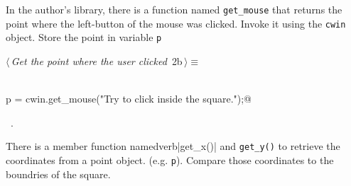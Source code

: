\documentclass{article}
\begin{document}
In the author's library, there is a function named \verb|get_mouse| that
returns the point where the left-button of the mouse was clicked. Invoke it
using the \verb|cwin| object. Store the point in variable \verb|p|
\begin{flushleft} \small
\begin{minipage}{\linewidth}\label{scrap3}\raggedright\small
{} $\langle\,${\it Get the point where the user clicked}\nobreak\ {\footnotesize {2b}}$\,\rangle\equiv$
\vspace{-1ex}
\begin{list}{}{} \item
\mbox{}\verb@@\\
\mbox{}\verb@Point p = cwin.get_mouse("Try to click inside the square.");@\\
\mbox{}\verb@@{\NWsep}
\end{list}
\vspace{-1.5ex}
\footnotesize
\begin{list}{}{\setlength{\itemsep}{-\parsep}\setlength{\itemindent}{-\leftmargin}}
\item \NWtxtMacroRefIn\ .

\item{}
\end{list}
\end{minipage}\vspace{4ex}
\end{flushleft}
There is a member function namedverb|get_x()| and \verb|get_y()| to retrieve
the coordinates from a point object. (e.g. \verb|p|). Compare those coordinates
to the boundries of the square.
\end{document}
